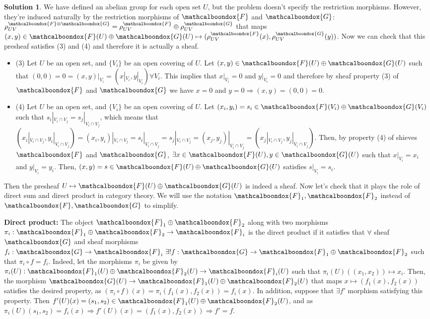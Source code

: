 \documentclass[12pt]{article}
\newcommand{\imp}{\ensuremath{\Rightarrow}}
\theoremstyle{definition}
\newtheorem*{sol}{Solution}
\newcommand{\sF}{\ensuremath{\mathcalboondox{F}}}
\newcommand{\sG}{\ensuremath{\mathcalboondox{G}}}
\begin{document}
\begin{sol}
	We have defined an abelian group for each open set $U$, but the problem doesn't specify the restriction morphisms. However, they're induced naturally by the restriction morphisms of $\sF$ and $\sG$: $\rho_{UV}^{\sF \oplus \sG} = \rho_{UV}^{\sF} \oplus \rho_{UV}^{\sG}$ that maps $(x,y) \in \sF(U) \oplus \sG(U) \mapsto (\rho_{UV}^{\sF}(x), \rho_{UV}^{\sG}(y))$. Now we can check that this presheaf satisfies (3) and (4) and therefore it is actually a sheaf.
	\begin{itemize}
		\item (3) Let $U$ be an open set, and $\{V_i\}$ be an open covering of $U$. Let $(x,y) \in \sF(U) \oplus \sG(U)$ such that $(0,0) = 0 = (x,y)|_{V_i} = (x|_{V_i}, y|_{V_i}) \forall V_i$. This implies that $x|_{V_i} = 0$ and $y|_{V_i} = 0$ and therefore by sheaf property (3) of $\sF$ and $\sG$ we have $x = 0$ and $y = 0 \imp (x,y) = (0,0) = 0$.

		\item (4) Let $U$ be an open set, and $\{V_i\}$ be an open covering of $U$. Let $(x_i, y_i) = s_i \in \sF(V_i) \oplus \sG(V_i)$ such that $s_i|_{V_i \cap V_j} = s_j|_{V_i \cap V_j}$, which means that $(x_i|_{V_i \cap V_j}, y_i|_{V_i \cap V_j}) = (x_i,y_i)|_{V_i \cap V_j} = s_i|_{V_i \cap V_j} = s_j|_{V_i \cap V_j} = (x_j,y_j)|_{V_i \cap V_j} = (x_j|_{V_i \cap V_j}, y_j|_{V_i \cap V_j})$. Then, by property (4) of shieves $\sF$ and $\sG$, $\exists x \in \sF(U), y \in \sG(U)$ such that $x|_{V_i} = x_i$ and $y|_{V_i} = y_i$. Then, $(x,y) = s \in \sF(U) \oplus \sG(U)$ satisfies $s|_{V_i} = s_i$.
	\end{itemize}

	Then the presheaf $U \mapsto \sF(U) \oplus \sG(U)$ is indeed a sheaf. Now let's check that it plays the role of direct sum and direct product in category theory. We will use the notation $\sF_1, \sF_2$ instead of $\sF, \sG$ to simplify.

	\textbf{Direct product:} The object $\sF_1 \oplus \sF_2$ along with two morphisms $\pi_i: \sF_1 \oplus \sF_2 \to \sF_i$ is the direct product if it satisfies that $\forall$ sheaf $\sG$ and sheaf morphisms $f_i: \sG \to \sF_i \, \, \exists ! f: \sG \to \sF_1 \oplus \sF_2$ such that $\pi_i \circ f = f_i$. Indeed, let the morphisms $\pi_i$ be given by $\pi_i(U): \sF_1(U) \oplus \sF_2(U) \to \sF_i(U)$ such that $\pi_i(U)((x_1,x_2)) \mapsto x_i$. Then, the morphism $\sG(U) \to \sF_1(U) \oplus \sF_2(U)$ that maps $x \mapsto (f_1(x), f_2(x))$ satisfies the desired property, as $(\pi_i \circ f)(x) = \pi_i(f_1(x), f_2(x)) = f_i(x)$. In addition, suppose that $\exists f'$ morphism satisfying this property. Then $f'(U)(x) = (s_1,s_2) \in \sF_1(U) \oplus \sF_2(U)$, and as $\pi_i(U)(s_1,s_2) = f_i(x) \imp f'(U)(x) = (f_1(x),f_2(x)) \imp f' = f$.


\end{sol}
\end{document}
